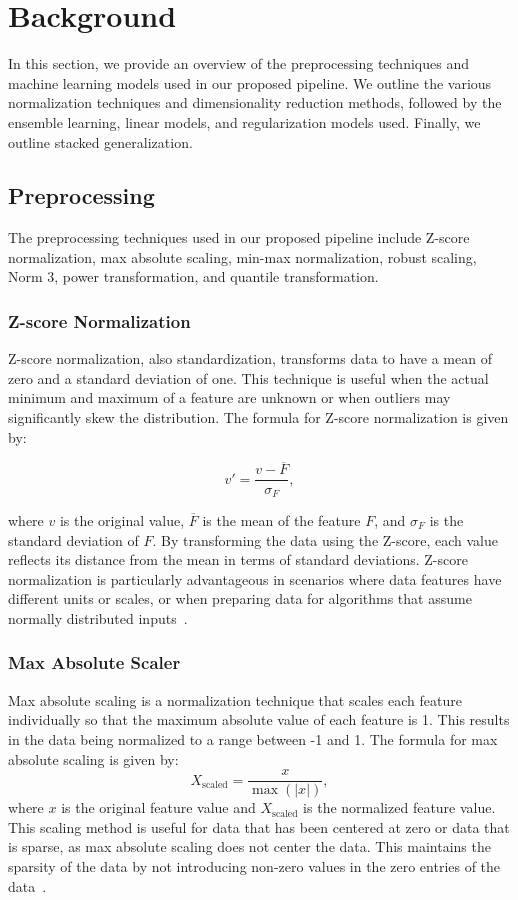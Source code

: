\section{Background}\label{sec:background}
In this section, we provide an overview of the preprocessing techniques and machine learning models used in our proposed pipeline. 
We outline the various normalization techniques and dimensionality reduction methods, followed by the ensemble learning, linear models, and regularization models used.
Finally, we outline stacked generalization. 

\subsection{Preprocessing}
The preprocessing techniques used in our proposed pipeline include Z-score normalization, max absolute scaling, min-max normalization, robust scaling, Norm 3, power transformation, and quantile transformation. 

\subsubsection{Z-score Normalization}
Z-score normalization, also standardization, transforms data to have a mean of zero and a standard deviation of one.
This technique is useful when the actual minimum and maximum of a feature are unknown or when outliers may significantly skew the distribution.
The formula for Z-score normalization is given by:

$$
v' = \frac{v - \overline{F}}{\sigma_F},
$$

where $v$ is the original value, $\overline{F}$ is the mean of the feature $F$, and $\sigma_F$ is the standard deviation of $F$.
By transforming the data using the Z-score, each value reflects its distance from the mean in terms of standard deviations.
Z-score normalization is particularly advantageous in scenarios where data features have different units or scales, or when preparing data for algorithms that assume normally distributed inputs~\cite{dataminingConcepts}.

\subsubsection{Max Absolute Scaler}
Max absolute scaling is a normalization technique that scales each feature individually so that the maximum absolute value of each feature is 1.
This results in the data being normalized to a range between -1 and 1.
The formula for max absolute scaling is given by:
$$
	X_{\text{scaled}} = \frac{x}{\max(|x|)},
$$
where $x$ is the original feature value and $X_{\text{scaled}}$ is the normalized feature value.
This scaling method is useful for data that has been centered at zero or data that is sparse, as max absolute scaling does not center the data.
This maintains the sparsity of the data by not introducing non-zero values in the zero entries of the data~\cite{Vasques2024}.

